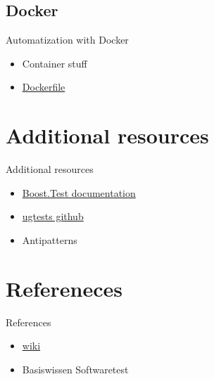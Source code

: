 \documentclass{beamer}
\begin{document}
        \subsection{Docker}
        \begin{frame}{Automatization with Docker}
            \begin{itemize}
                \item Container stuff
                \item \href{https://github.com/Tobias-Trautmann/docker4ug4}{Dockerfile}
            \end{itemize}
        \end{frame}

    \section{Additional resources}
    \begin{frame}{Additional resources}
            \begin{itemize}
                \item \href{https://www.boost.org/doc/libs/1_58_0/libs/test/}{Boost.Test documentation}
                \item \href{https://github.com/UG4/plugin_UGTest}{ugtests github}
                \item Antipatterns
            \end{itemize}
    \end{frame}

    \section{Refereneces}
    \begin{frame}{References}
        \begin{itemize}
            \item \href{https://en.wikipedia.org/wiki/Software_testing}{wiki}
            \item Basiswissen Softwaretest
        \end{itemize}
    \end{frame}
\end{document}
